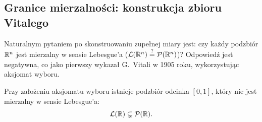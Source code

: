 \subsection{Granice mierzalności: konstrukcja zbioru Vitalego}\label{sec:vitali}

Naturalnym pytaniem po skonstruowaniu zupełnej miary jest: czy każdy podzbiór $\mathbb{R}^{n}$ jest mierzalny w sensie Lebesgue'a ($\mathcal{L}({\mathbb{R}^{n}}) \stackrel{?}{=} \mathcal{P}(\mathbb{R}^{n})$)? Odpowiedź jest negatywna, co jako pierwszy wykazał G.~Vitali w 1905 roku, wykorzystując aksjomat wyboru.

\begin{tw}\label{tw:vitali}
    Przy założeniu aksjomatu wyboru istnieje podzbiór odcinka $[0, 1]$, który nie jest mierzalny w sensie Lebesgue'a:
    \begin{equation*}
        \mathcal{L}({\mathbb{R}}) \subsetneq \mathcal{P}(\mathbb{R}).
    \end{equation*}
\end{tw}

